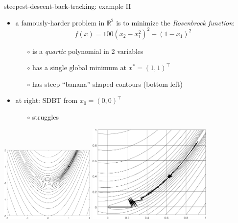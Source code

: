\documentclass[10pt,hyperref]{beamer}
\newcommand{\RR}{\mathbb{R}}
\begin{document}
\begin{frame}{steepest-descent-back-tracking: example II}

\begin{itemize}
\item a famously-harder problem in $\RR^2$ is to minimize the \emph{Rosenbrock function}:
    $$f(x) = 100 (x_2 - x_1^2)^2 + (1 - x_1)^2$$
    \begin{itemize}
    \vspace{-4mm}
    \item[$\circ$] is a \emph{quartic} polynomial in 2 variables
    \item[$\circ$] has a single global minimum at $x^*=(1,1)^\top$
    \item[$\circ$] has steep ``banana'' shaped contours (bottom left)
    \end{itemize}

\smallskip
\item at right: SDBT from $x_0=(0,0)^\top$
    \begin{itemize}
    \item[$\circ$] struggles
    \end{itemize}
\end{itemize}

\vspace{-8mm}

\hspace{0.3in}
\includegraphics[width=0.35\textwidth,keepaspectratio=true]{rosencontour}
\hspace{0.3in}
\includegraphics[width=0.46\textwidth,keepaspectratio=true]{sdrosenslow}
\end{frame}
\end{document}
